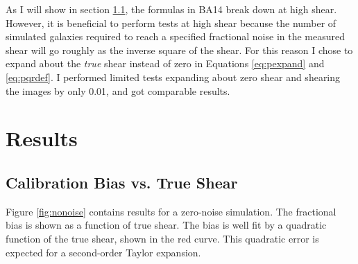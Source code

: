 \documentclass[12pt,preprint]{aastex}
\begin{document}
As I will show in section \ref{sec:truebias}, the formulas in BA14 break down
at high shear.  However, it is beneficial to perform tests at high shear
because the number of simulated galaxies required to reach a specified
fractional noise in the measured shear will go roughly as the inverse square of
the shear.  For this reason I chose to expand about the {\it true} shear
instead of zero in Equations \ref{eq:pexpand} and \ref{eq:pqrdef}.  I performed
limited tests expanding about zero shear and shearing the images by only 0.01,
and got comparable results. 

\section{Results} \label{sec:results}

\subsection{Calibration Bias vs. True Shear} \label{sec:truebias}

Figure \ref{fig:nonoise} contains results for a zero-noise simulation.  The
fractional bias is shown as a function of true shear.  The bias is well fit by
a quadratic function of the true shear, shown in the red curve. This quadratic
error is expected for a second-order Taylor expansion.
\end{document}
